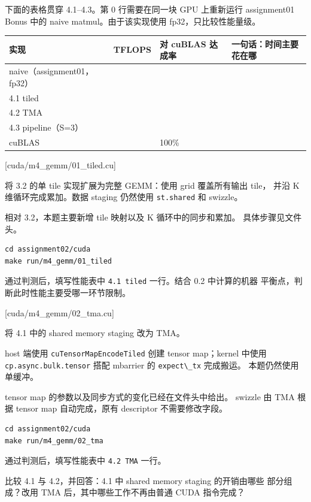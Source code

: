 \documentclass[11pt,a4paper,fontset=none]{ctexart}
\providecommand{\passthrough}[1]{#1}
\begin{document}
下面的表格贯穿 4.1--4.3。第 0 行需要在同一块 GPU 上重新运行 assignment01
Bonus 中的 naive matmul。由于该实现使用 fp32，只比较性能量级。

\begin{longtable}[]{@{}llll@{}}
\toprule\noalign{}
实现 & TFLOPS & 对 cuBLAS 达成率 & 一句话：时间主要花在哪 \\
\midrule\noalign{}
\endhead
\bottomrule\noalign{}
\endlastfoot
naive（assignment01，fp32） & & & \\
4.1 tiled & & & \\
4.2 TMA & & & \\
4.3 pipeline（S=3） & & & \\
cuBLAS & & 100\% & \\
\end{longtable}

[cuda/m4\_gemm/01\_tiled.cu]

将 3.2 的单 tile 实现扩展为完整 GEMM：使用 grid 覆盖所有输出 tile， 并沿
K 维循环完成累加。数据 staging 仍然使用
\passthrough{\lstinline!st.shared!} 和 swizzle。

相对 3.2，本题主要新增 tile 映射以及 K 循环中的同步和累加。
具体步骤见文件头。

\begin{lstlisting}
cd assignment02/cuda
make run/m4_gemm/01_tiled
\end{lstlisting}

通过判测后，填写性能表中 \passthrough{\lstinline!4.1 tiled!} 一行。结合
0.2 中计算的机器 平衡点，判断此时性能主要受哪一环节限制。

[cuda/m4\_gemm/02\_tma.cu]

将 4.1 中的 shared memory staging 改为 TMA。

host 端使用 \passthrough{\lstinline!cuTensorMapEncodeTiled!} 创建 tensor
map；kernel 中使用 \passthrough{\lstinline!cp.async.bulk.tensor!} 搭配
mbarrier 的 \passthrough{\lstinline!expect\_tx!} 完成搬运。
本题仍然使用单缓冲。

tensor map 的参数以及同步方式的变化已经在文件头中给出。 swizzle 由 TMA
根据 tensor map 自动完成，原有 descriptor 不需要修改字段。

\begin{lstlisting}
cd assignment02/cuda
make run/m4_gemm/02_tma
\end{lstlisting}

通过判测后，填写性能表中 \passthrough{\lstinline!4.2 TMA!} 一行。

比较 4.1 与 4.2，并回答：4.1 中 shared memory staging 的开销由哪些
部分组成？改用 TMA 后，其中哪些工作不再由普通 CUDA 指令完成？
\end{document}
